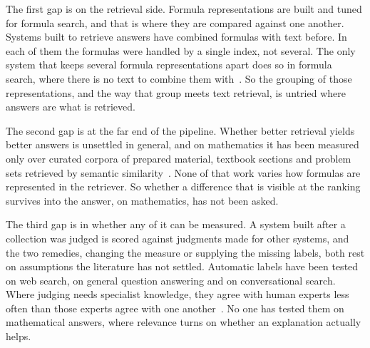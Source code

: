 %
%
%

The first gap is on the retrieval side. Formula representations are built and tuned for
formula search, and that is where they are compared against one another. Systems built to
retrieve answers have combined formulas with text before. In each of them the formulas
were handled by a single index, not several. The only system that keeps several formula
representations apart does so in formula search, where there is no text to combine them
with~\cite{mansouri2022dprl}. So the grouping of those representations, and the way that
group meets text retrieval, is untried where answers are what is retrieved.

The second gap is at the far end of the pipeline. Whether better retrieval yields better
answers is unsettled in general, and on mathematics it has been measured only over curated
corpora of prepared material, textbook sections and problem sets retrieved by semantic
similarity~\cite{henkel2024mathrag,alshammari2026mathnet}. None of that work varies how
formulas are represented in the retriever. So whether a difference that is visible at the
ranking survives into the answer, on mathematics, has not been asked.

The third gap is in whether any of it can be measured. A system built after a collection
was judged is scored against judgments made for other systems, and the two remedies,
changing the measure or supplying the missing labels, both rest on assumptions the
literature has not settled. Automatic labels have been tested on web search, on general
question answering and on conversational search. Where judging needs specialist knowledge,
they agree with human experts less often than those experts agree with one
another~\cite{szymanski2025judgelimits}. No one has
tested them on mathematical answers, where relevance turns on whether an explanation
actually helps.
